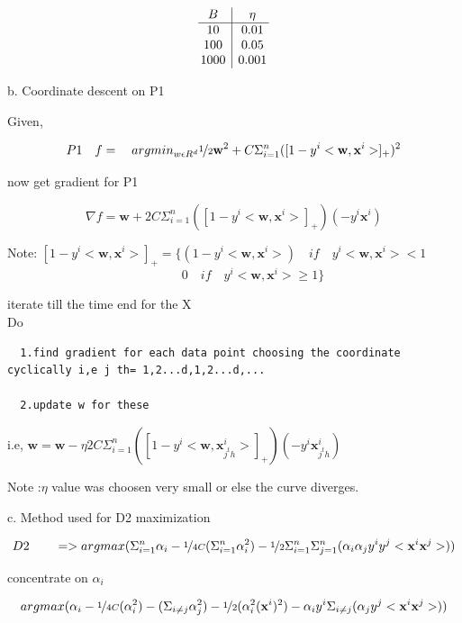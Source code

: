 \documentclass{article}
\begin{document}
\[
\begin{array}{@{\,} c|c @{\,}}
 B & \eta \\
  \hline
 10 & 0.01 \\
 100 & 0.05 \\
 1000 & 0.001 \\
\end{array}\] 


\medskip


b. Coordinate descent on P1


Given,

	\[ P1 \quad f = \quad argmin _{ w \epsilon R^d } \nicefrac{1}{2} \textbf{w} ^2  + C \Sigma _{i=1} ^n  ([ 1 - y^i < \textbf{w} ,  \textbf{x} ^i > ]_+)^2   \]

now  get gradient for P1 

\[  \nabla f =  \textbf{w}  + 2 C \Sigma _{i=1} ^n  ([ 1 - y^i <\textbf{w} ,  \textbf{x} ^i> ]_+)(-y^i \textbf{x}^i) \]



Note: $ [ 1 - y^i <\textbf{w} ,  \textbf{x} ^i> ]_+ = \{ ( 1 - y^i <\textbf{w} ,  \textbf{x} ^i> ) \quad if \quad y^i <\textbf{w} ,  \textbf{x} ^i> < 1 $ \\
\[ \quad \qquad  0 \quad if \quad y^i <\textbf{w} ,  \textbf{x} ^i> \geq 1 \} \] 


iterate till the time end for the X
\\

Do
\begin{verbatim}
  1.find gradient for each data point choosing the coordinate cyclically i,e j th= 1,2...d,1,2...d,...  
  
  2.update w for these 
  \end{verbatim} 
   i.e,     $ \textbf{w}  = \textbf{w} - \eta 2 C \Sigma _{i=1} ^{n}  ([ 1 - y^i <\textbf{w} ,  \textbf{x} ^i_{ j^th } > ]_+)(-y^i \textbf{x}^i _{ j^th } )$

Note :$ \eta $ value was choosen very small or else the curve diverges.

\medskip


c. Method used for  D2  maximization 

\[ D2  \qquad => argmax(\Sigma _{i=1} ^n \alpha _i - \nicefrac{1}{4C} (\Sigma _{i=1} ^n  \alpha _i ^2) - \nicefrac{1}{2}\Sigma _{i=1} ^n \Sigma _{j=1} ^n ( \alpha _i \alpha _j y^i y^j< \textbf{x}^i \textbf{x}^j>)) \]

concentrate on $ \alpha _i $

\[  argmax( \alpha _i - \nicefrac{1}{4C} (  \alpha _i ^2) -  (\Sigma _{i \neq j}   \alpha _j ^2) - \nicefrac{1}{2}( \alpha _i^2 ( \textbf{x} ^i )^2) - \alpha _iy^i\Sigma _{i \neq j}  (  \alpha _j  y^j< \textbf{x}^i \textbf{x}^j>)) \]
\end{document}
